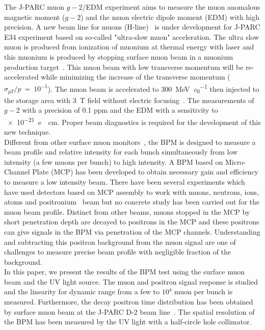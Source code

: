 \documentclass[preprint,3p,twocolumn]{elsarticle}
\begin{document}
The J-PARC muon $g-2$/EDM experiment \cite{E34} aims to measure the muon anomalous magnetic moment ($g-2$) and the muon electric dipole moment (EDM) with high precision.
A new beam line for muons (H-line)~\cite{h-line} is under development for J-PARC E34 experiment based on so-called "ultra-slow muon" acceleration.
The ultra slow muon is produced from ionization of muonium at thermal energy with laser and this muonium is produced by stopping surface muon beam in a muonium production target~\cite{muonium}.  
This muon beam with low transverse momentum will be re-accelerated while minimizing the increase of the transverse momentum ($\sigma_{pT}/p~=~10^{-5}$).
The muon beam is accelerated to \SI{300}{\MeV\per\clight} \cite{IH} then injected to the storage area with \SI{3}{T} field without electric focusing~\cite{injection}. The measurements of $g-2$ with a precision of 0.1 ppm and the EDM with a sensitivity to \SI{e-21}{e\cdot cm}.  Proper beam diagnostics is required for the development of this new technique. \\
Different from other surface muon monitors~\cite{muon_bpm1}, the BPM is designed to measure a beam profile and relative intensity for each bunch simultaneously from low intensity (a few muons per bunch) to high intensity.
A BPM based on Micro-Channel Plate (MCP) has been developed to obtain necessary gain and efficiency to measure a low intensity beam.
There have been several experiments which have used detectors based on MCP assembly to work with muons, neutrons, ions, atoms and positronium~\cite{muon_bpm2, neutron, Ps} beam
but no concrete study has been carried out for the muon beam profile.
Distinct from other beams, muons stopped in the MCP by short penetration depth are decayed to positrons in the MCP and these positrons can give signals in the BPM via penetration of the MCP channels. 
Understanding and subtracting this positron background from the muon signal are one of challenges to measure precise beam profile with negligible fraction of the background.  \\
In this paper, we present the results of the BPM test using the surface muon beam and the UV light source.
The muon and positron signal response is studied and the linearity for dynamic range from a few to $10^{4}$ muon per bunch is measured.
Furthermore, the decay positron time distribution has been obtained by surface muon beam at the J-PARC D-2 beam line~\cite{D-line, D-line1}.  
The spatial resolution of the BPM has been measured by the UV light with a half-circle hole collimator.
\end{document}
